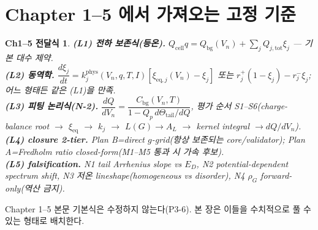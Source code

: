 \documentclass[11pt,a4paper]{article}
\newtheorem*{linkbox}{Ch1--5 전달식}
\newcommand{\eq}{\mathrm{eq}}
\newcommand{\tot}{\mathrm{tot}}
\newcommand{\bg}{\mathrm{bg}}
\newcommand{\cell}{\mathrm{cell}}
\begin{document}
\section{Chapter 1--5 에서 가져오는 고정 기준}\label{sec:ch6_inherit}
\begin{linkbox}
\textbf{(L1) 전하 보존식(등온).} $Q_\cell q=Q_\bg(V_n)+\sum_j Q_{j,\tot}\xi_j$ — 기본 대수 제약.\\
\textbf{(L2) 동역학.} $\dfrac{d\xi_j}{dt}=k_j^{\mathrm{phys}}(V_n,q,T,I)[\xi_{\eq,j}(V_n)-\xi_j]$ 또는
$r_j^+(1-\xi_j)-r_j^-\xi_j$; 어느 형태든 같은 (L1)을 만족.\\
\textbf{(L3) 피팅 논리식(N-2).} $\dfrac{dQ}{dV_n}=\dfrac{C_\bg(V_n,T)}{1-Q_p\,d\Theta_{\mathrm{tail}}/dQ}$,
평가 순서 S1--S6(charge-balance root $\to$ $\xi_{\eq}$ $\to$ $k_j$ $\to$ $L(G)\to A_L$ $\to$ kernel
integral $\to dQ/dV_n$).\\
\textbf{(L4) closure 2-tier.} \emph{Plan B}=direct $g$-grid(항상 보존되는 core/validator);
\emph{Plan A}=Fredholm ratio closed-form(M1--M5 통과 시 가속 후보).\\
\textbf{(L5) falsification.} N1 tail Arrhenius slope vs $E_D$, N2 potential-dependent spectrum shift,
N3 저온 lineshape(homogeneous vs disorder), N4 $\rho_G$ forward-only(역산 금지).
\end{linkbox}
Chapter 1--5 본문 기본식은 수정하지 않는다(P3-6). 본 장은 이들을 수치적으로 풀 수 있는 형태로 배치한다.

\end{document}
